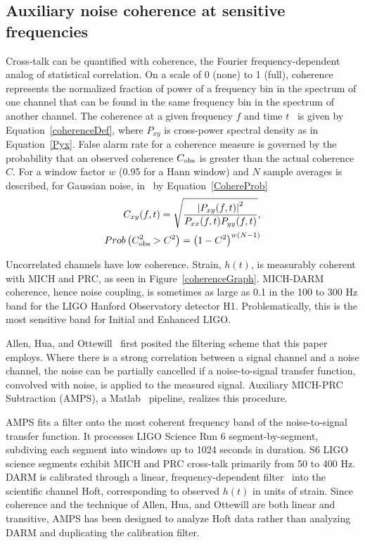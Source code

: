         \subsection{Auxiliary noise coherence at sensitive frequencies}
        \label{aux_noise}

	 Cross-talk can be quantified with coherence, the Fourier frequency-dependent analog of statistical correlation. On a scale of 0 (none) to 1 (full), coherence represents the normalized fraction of power of a frequency bin in the spectrum of one channel that can be found in the same frequency bin in the spectrum of another channel. The coherence at a given frequency $f$ and time $t$~\cite{Boashash1990} is given by Equation~\ref{coherenceDef}, where $P_{xy}$ is cross-power spectral density as in Equation~\ref{Pyx}. False alarm rate for a coherence measure is governed by the probability that an observed coherence $C_{\textup{obs}}$ is greater than the actual coherence $C$. For a window factor $w$ (0.95 for a Hann window) and $N$ sample averages is described, for Gaussian noise, in~\cite{MendellCohere2013} by Equation~\ref{CohereProb}
\begin{eqnarray}
C_{xy}(f, t) = \sqrt{\frac{\left| P_{xy}(f, t) \right|^2}{P_{xx}(f, t) P_{yy} (f, t)}}\label{coherenceDef}, \\
Prob\left( C_{\textup{obs}}^2 > C^2\right) = \left(1-C^2\right)^{w(N-1)} \label{CohereProb}
\end{eqnarray}

Uncorrelated channels have low coherence. Strain, $h(t)$, is measurably coherent with MICH and PRC, as seen in Figure~\ref{coherenceGraph}. MICH-DARM coherence, hence noise coupling, is sometimes as large as 0.1 in the 100 to 300 Hz band for the LIGO Hanford Observatory detector H1. Problematically, this is the most sensitive band for Initial and Enhanced LIGO. 


	Allen, Hua, and Ottewill~\cite{AllenHuaOttewill1999} first posited the filtering scheme that this paper employs. Where there is a strong correlation between a signal channel and a noise channel, the noise can be partially cancelled if a noise-to-signal transfer function, convolved with noise, is applied to the measured signal. Auxiliary MICH-PRC Subtraction (AMPS), a Matlab~\cite{Matlab2012a} pipeline, realizes this procedure.

AMPS fits a filter onto the most coherent frequency band of the noise-to-signal transfer function. It processes LIGO Science Run 6 segment-by-segment, subdiving each segment into windows up to 1024 seconds in duration. S6 LIGO science segments exhibit MICH and PRC cross-talk primarily from 50 to 400 Hz. DARM is calibrated through a linear, frequency-dependent filter~\cite{LIGOCal2010} into the scientific channel Hoft, corresponding to observed $h(t)$ in units of strain. Since coherence and the technique of Allen, Hua, and Ottewill are both linear and transitive, AMPS has been designed to analyze Hoft data rather than analyzing DARM and duplicating the calibration filter.

